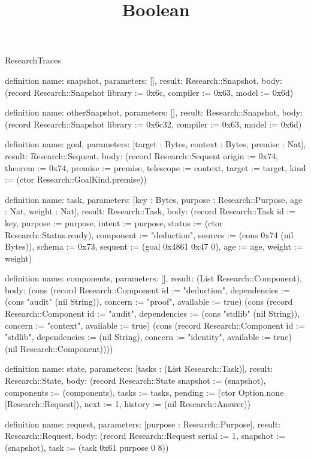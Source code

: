 \begin{lexlean}{ResearchTraces}
\title{Boolean}
\begin{semanticmodule}
definition{
  name: snapshot,
  parameters: [],
  result: Research::Snapshot,
  body: (record Research::Snapshot {library := 0x6c, compiler := 0x63, model := 0x6d})
}

definition{
  name: otherSnapshot,
  parameters: [],
  result: Research::Snapshot,
  body: (record Research::Snapshot {library := 0x6c32, compiler := 0x63, model := 0x6d})
}

definition{
  name: goal,
  parameters: [target : Bytes, context : Bytes, premise : Nat],
  result: Research::Sequent,
  body: (record Research::Sequent {origin := 0x74, theorem := 0x74, premise := premise, telescope := context, target := target, kind := (ctor Research::GoalKind.premise)})
}

definition{
  name: task,
  parameters: [key : Bytes, purpose : Research::Purpose, age : Nat, weight : Nat],
  result: Research::Task,
  body: (record Research::Task {id := key, purpose := purpose, intent := purpose, status := (ctor Research::Status.ready), component := "deduction", sources := (cons 0x74 (nil Bytes)), schema := 0x73, sequent := (goal 0x4861 0x47 0), age := age, weight := weight})
}

definition{
  name: components,
  parameters: [],
  result: (List Research::Component),
  body: (cons (record Research::Component {id := "deduction", dependencies := (cons "audit" (nil String)), concern := "proof", available := true}) (cons (record Research::Component {id := "audit", dependencies := (cons "stdlib" (nil String)), concern := "context", available := true}) (cons (record Research::Component {id := "stdlib", dependencies := (nil String), concern := "identity", available := true}) (nil Research::Component))))
}

definition{
  name: state,
  parameters: [tasks : (List Research::Task)],
  result: Research::State,
  body: (record Research::State {snapshot := (snapshot), components := (components), tasks := tasks, pending := (ctor Option.none [Research::Request]), next := 1, history := (nil Research::Answer)})
}

definition{
  name: request,
  parameters: [purpose : Research::Purpose],
  result: Research::Request,
  body: (record Research::Request {serial := 1, snapshot := (snapshot), task := (task 0x61 purpose 0 8)})
}


\end{semanticmodule}
\end{lexlean}
